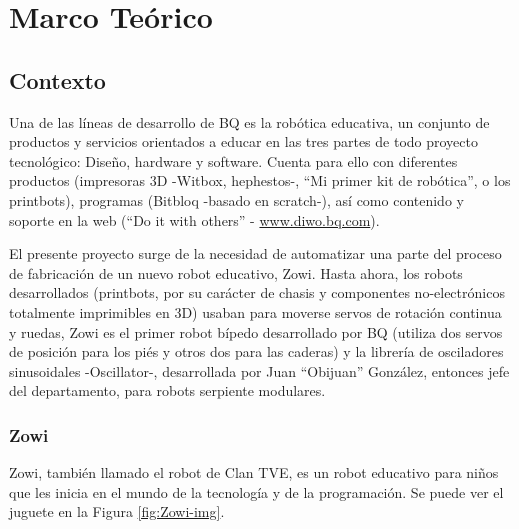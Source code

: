 
\chapter{Marco Teórico} %

\label{Chapter2} %


\section{Contexto}

Una de las líneas de desarrollo de BQ es la robótica educativa, un conjunto de productos y servicios orientados a educar en las tres partes de todo proyecto tecnológico: Diseño, hardware y software. Cuenta para ello con diferentes productos (impresoras 3D -Witbox, hephestos-, ``Mi primer kit de robótica'', o los printbots), programas (Bitbloq -basado en scratch-), así como contenido y soporte en la web (``Do it with others'' - \url{www.diwo.bq.com}).

El presente proyecto surge de la necesidad de automatizar una parte del proceso de fabricación de un nuevo robot educativo, Zowi. Hasta ahora, los robots desarrollados (printbots, por su carácter de chasis y componentes no-electrónicos totalmente imprimibles en 3D) usaban para moverse servos de rotación continua y ruedas, Zowi es el primer robot bípedo desarrollado por BQ (utiliza dos servos de posición para los piés y otros dos para las caderas) y la librería de osciladores sinusoidales -Oscillator-, desarrollada por Juan ``Obijuan'' González, entonces jefe del departamento, para robots serpiente modulares.

\subsection{Zowi}
Zowi, también llamado el robot de Clan TVE, es un robot educativo para niños que les inicia en el mundo de la tecnología y de la programación. Se puede ver el juguete en la Figura \ref{fig:Zowi-img}.

